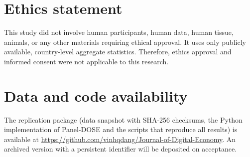 \documentclass[12pt]{article}
\begin{document}
\section*{Ethics statement}
This study did not involve human participants, human data, human tissue, animals, or any other materials requiring ethical approval. It uses only publicly available, country-level aggregate statistics. Therefore, ethics approval and informed consent were not applicable to this research.

\section*{Data and code availability}
The replication package (data snapshot with SHA-256 checksums, the Python implementation of Panel-DOSE and the scripts that reproduce all results) is available at \url{https://github.com/vinhqdang/Journal-of-Digital-Economy}. An archived version with a persistent identifier will be deposited on acceptance.
\end{document}
